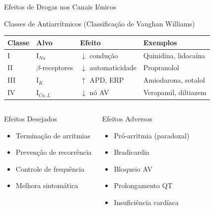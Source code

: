 \begin{frame}{Efeitos de Drogas nos Canais Iônicos}
\begin{block}{Classes de Antiarrítmicos (Classificação de Vaughan Williams)}
\begin{center}
\begin{tabular}{llll}
\toprule
\textbf{Classe} & \textbf{Alvo} & \textbf{Efeito} & \textbf{Exemplos} \\
\midrule
I & I$_{Na}$ & $\downarrow$ condução & Quinidina, lidocaína \\
II & $\beta$-receptores & $\downarrow$ automaticidade & Propranolol \\
III & I$_K$ & $\uparrow$ APD, ERP & Amiodarona, sotalol \\
IV & I$_{Ca,L}$ & $\downarrow$ nó AV & Verapamil, diltiazem \\
\bottomrule
\end{tabular}
\end{center}
\end{block}

\vspace{0.3cm}

\begin{columns}
\begin{exampleblock}{Efeitos Desejados}
\begin{itemize}
    \item Terminação de arritmias
    \item Prevenção de recorrência
    \item Controle de frequência
    \item Melhora sintomática
\end{itemize}
\end{exampleblock}

\begin{alertblock}{Efeitos Adversos}
\begin{itemize}
    \item Pró-arritmia (paradoxal)
    \item Bradicardia
    \item Bloqueio AV
    \item Prolongamento QT
    \item Insuficiência cardíaca
\end{itemize}
\end{alertblock}
\end{columns}

\vspace{0.3cm}

\end{frame}

